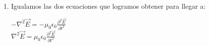 \documentclass[a4paper]{article}
\begin{document}
\begin{multicols}{2}
\begin{itemize}
\begin{enumerate}
\begin{center}
                                        $-\nabla \times \frac{\partial \vec{B}}{\partial t} = -\frac{\partial}{\partial t} (\nabla \times \vec{B})$ \hspace{5mm} [Amp-Max] \\[5pt]
                                        $-\nabla \times \frac{\partial \vec{B}}{\partial t} = -\frac{\partial}{\partial t} (\mu_0 \epsilon_0 \frac{\partial \vec{E}}{\partial t}) $ \\[5pt]
                                        $-\nabla \times \frac{\partial \vec{B}}{\partial t} = - \mu_0 \epsilon_0 \frac{\partial ^2 \vec{E}}{\partial t^2}$
                                    \end{center}
                                \item Igualamos las dos ecuaciones que logramos obtener para llegar a:
                                    \begin{center}
                                        $-\nabla ^2\vec{E} = -\mu_0 \epsilon_0 \frac{\partial ^2 \vec{E}}{\partial t^2}$ \\[5pt]
                                        $\nabla ^2\vec{E} = \mu_0 \epsilon_0 \frac{\partial ^2 \vec{E}}{\partial t^2}$ \\[5pt]
                                    \end{center}


\end{enumerate}
\end{itemize}
\end{multicols}
\end{document}
